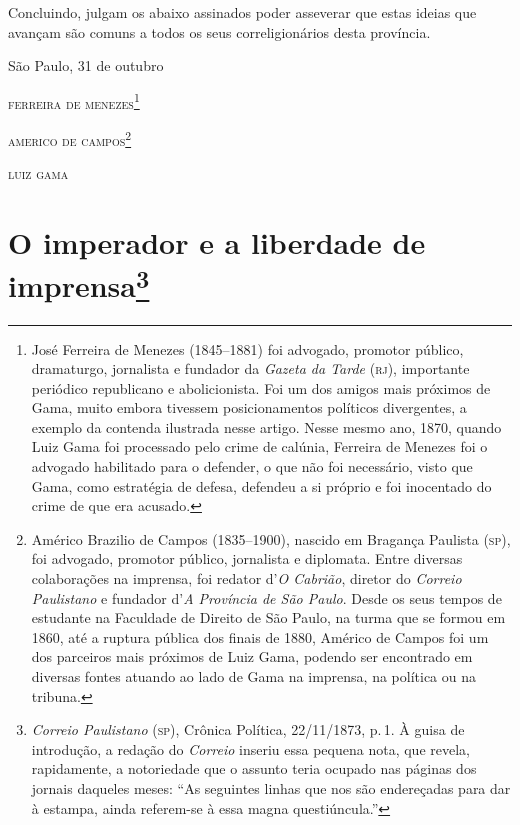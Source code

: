 Concluindo, julgam os abaixo assinados poder asseverar que estas ideias
que avançam são comuns a todos os seus correligionários desta província.

\begin{flushright}
São Paulo, 31 de outubro

\textsc{ferreira de menezes}\footnote{ José Ferreira de Menezes (1845--1881) foi
  advogado, promotor público, dramaturgo, jornalista e fundador da
  \emph{Gazeta da Tarde} (\textsc{rj}), importante periódico republicano e
  abolicionista. Foi um dos amigos mais próximos de Gama, muito embora
  tivessem posicionamentos políticos divergentes, a exemplo da contenda
  ilustrada nesse artigo. Nesse mesmo ano, 1870, quando Luiz Gama foi
  processado pelo crime de calúnia, Ferreira de Menezes foi o advogado
  habilitado para o defender, o que não foi necessário, visto que Gama,
  como estratégia de defesa, defendeu a si próprio e foi inocentado do
  crime de que era acusado.}

\textsc{americo de campos}\footnote{ Américo Brazilio de Campos (1835--1900),
  nascido em Bragança Paulista (\textsc{sp}), foi advogado, promotor público,
  jornalista e diplomata. Entre diversas colaborações na imprensa, foi
  redator d'\emph{O Cabrião}, diretor do \emph{Correio Paulistano} e
  fundador d'\emph{A Província de São Paulo}. Desde os seus tempos de
  estudante na Faculdade de Direito de São Paulo, na turma que se formou
  em 1860, até a ruptura pública dos finais de 1880, Américo de Campos
  foi um dos parceiros mais próximos de Luiz Gama, podendo ser
  encontrado em diversas fontes atuando ao lado de Gama na imprensa, na
  política ou na tribuna.}

\textsc{luiz gama}
\end{flushright}

\chapter{O imperador e a liberdade de imprensa\footnote{\emph{Correio Paulistano} (\textsc{sp}), Crônica Política,
  22/11/1873, p.\,1. À guisa de introdução, a redação do \emph{Correio}
  inseriu essa pequena nota, que revela, rapidamente, a notoriedade que
  o assunto teria ocupado nas páginas dos jornais daqueles meses: ``As
  seguintes linhas que nos são endereçadas para dar à estampa, ainda
  referem-se à essa magna questiúncula.''}} %

